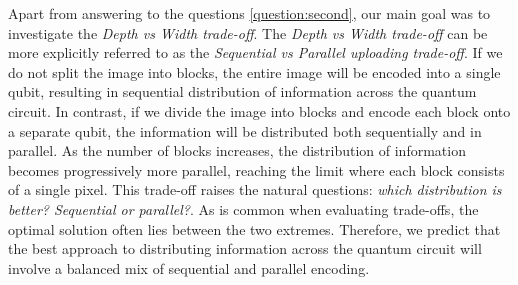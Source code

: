Apart from answering to the questions \ref{question:second}, our main goal was to 
investigate the \textit{Depth vs Width trade-off}.
The \textit{Depth vs Width trade-off} can be more explicitly referred to as the
\textit{Sequential vs Parallel uploading trade-off}.
If we do not split the image into blocks, the entire image will be encoded into a single qubit, 
resulting in sequential distribution of information across the quantum circuit. 
In contrast, if we divide the image into blocks and encode each block onto a separate qubit, 
the information will be distributed both sequentially and in parallel. As the number of blocks increases, 
the distribution of information becomes progressively more parallel, reaching the limit where each 
block consists of a single pixel.
This trade-off raises the natural questions: \textit{which distribution is better? Sequential or parallel?}.
As is common when evaluating trade-offs, the optimal solution often lies between the two extremes. 
Therefore, we predict that the best approach to distributing information across the quantum circuit 
will involve a balanced mix of sequential and parallel encoding.\\

